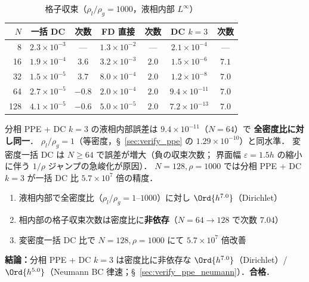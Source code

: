\begin{table}[htbp]
\centering
\caption{格子収束（$\rho_l/\rho_g = 1000$，液相内部 $L^\infty$）}
\label{tab:split_ppe_dc_convergence}
\renewcommand{\arraystretch}{1.2}
\footnotesize
\begin{tabular}{rcccccc}
\toprule
$N$ & 一括 DC & 次数 & FD 直接 & 次数 & DC $k{=}3$ & 次数 \\
\midrule
  8 & $2.3 \times 10^{-3}$  & ---      & $1.3 \times 10^{-2}$ & ---   & $2.1 \times 10^{-4}$  & --- \\
 16 & $1.9 \times 10^{-4}$  & $3.6$    & $3.2 \times 10^{-3}$ & $2.0$ & $1.5 \times 10^{-6}$  & $7.1$ \\
 32 & $1.5 \times 10^{-5}$  & $3.7$    & $8.0 \times 10^{-4}$ & $2.0$ & $1.2 \times 10^{-8}$  & $7.0$ \\
 64 & $2.7 \times 10^{-5}$  & $-0.8$   & $2.0 \times 10^{-4}$ & $2.0$ & $9.4 \times 10^{-11}$ & $7.0$ \\
128 & $4.1 \times 10^{-5}$  & $-0.6$   & $5.0 \times 10^{-5}$ & $2.0$ & $7.2 \times 10^{-13}$ & $7.0$ \\
\bottomrule
\end{tabular}
\end{table}

分相 PPE + DC $k = 3$ の液相内部誤差は $9.4 \times 10^{-11}$（$N = 64$）で
\textbf{全密度比に対し同一}．
$\rho_l/\rho_g = 1$（等密度，§~\ref{sec:verify_ppe} の $1.29 \times 10^{-10}$）と同水準．
変密度一括 DC は $N \geq 64$ で誤差が増大（負の収束次数；
界面幅 $\varepsilon = 1.5h$ の縮小に伴う $1/\rho$ ジャンプの急峻化が原因）．
$N = 128, \rho = 1000$ では分相 PPE + DC $k=3$ が一括 DC 比 $5.7 \times 10^7$ 倍の精度．

\begin{tcolorbox}[resultbox, title={分相 PPE + DC $k = 3$ の精度検証}]
\begin{enumerate}[noitemsep]
  \item 液相内部で全密度比（$\rho_l/\rho_g = 1$--$1000$）に対し $\Ord{h^{7.0}}$（Dirichlet）
  \item 相内部の格子収束次数は密度比に\textbf{非依存}（$N = 64 \to 128$ で次数 $7.04$）
  \item 変密度一括 DC 比で $N = 128, \rho = 1000$ にて $5.7 \times 10^7$ 倍改善
\end{enumerate}
\end{tcolorbox}

\noindent\textbf{結論：}分相 PPE + DC $k = 3$ は密度比に非依存な $\Ord{h^{7.0}}$（Dirichlet）/ $\Ord{h^{5.0}}$（Neumann BC 律速；§~\ref{sec:verify_ppe_neumann}）．\textbf{合格}．

